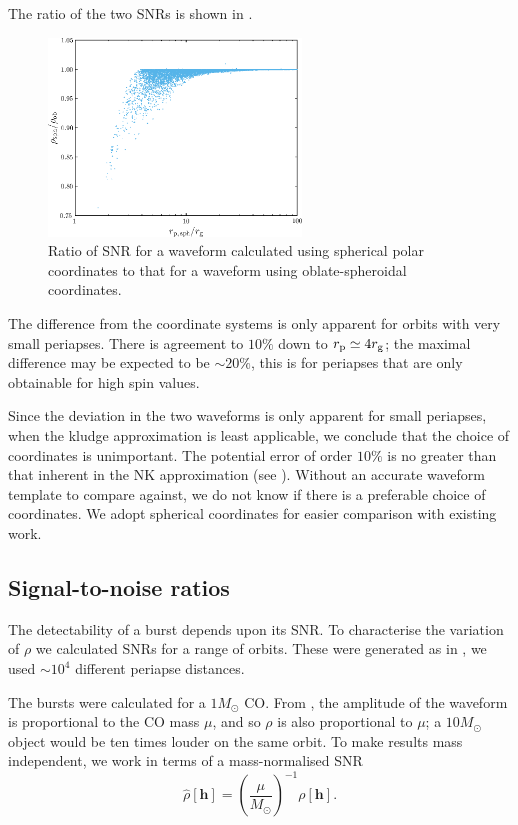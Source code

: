 The ratio of the two SNRs is shown in .
\begin{figure}[!htp]
\begin{center}
 \includegraphics[width=0.6\textwidth]{./images/Fig_SNR_ratio}
 \caption{Ratio of SNR for a waveform calculated using spherical polar coordinates to that for a waveform using oblate-spheroidal coordinates.\label{fig:Oblate_sphere}}
   \end{center}
\end{figure}
The difference from the coordinate systems is only apparent for orbits with very small periapses. There is agreement to $10\%$ down to $r_\mathrm{p} \simeq 4 r_\mathrm{g}$; the maximal difference may be expected to be $\sim 20\%$, this is for periapses that are only obtainable for high spin values.

Since the deviation in the two waveforms is only apparent for small periapses, when the kludge approximation is least applicable, we conclude that the choice of coordinates is unimportant. The potential error of order $10\%$ is no greater than that inherent in the NK approximation (see ). Without an accurate waveform template to compare against, we do not know if there is a preferable choice of coordinates. We adopt spherical coordinates for easier comparison with existing work.

\subsection{Signal-to-noise ratios}

The detectability of a burst depends upon its SNR. To characterise the variation of $\rho$ we calculated SNRs for a range of orbits. These were generated as in , we used $\sim 10^4$ different periapse distances.

The bursts were calculated for a $1 M_\odot$ CO. From , the amplitude of the waveform is proportional to the CO mass $\mu$, and so $\rho$ is also proportional to $\mu$; a $10 M_\odot$ object would be ten times louder on the same orbit. To make results mass independent, we work in terms of a mass-normalised SNR
\begin{equation}
\hat{\rho}[\boldsymbol{h}] = \left(\frac{\mu}{M_\odot}\right)^{-1}\rho[\boldsymbol{h}].
\end{equation}

